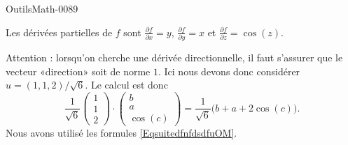 
\begin{corrige}{OutilsMath-0089}

    Les dérivées partielles de $f$ sont $\frac{ \partial f }{ \partial x }=y$, $\frac{ \partial f }{ \partial y }=x$ et $\frac{ \partial f }{ \partial z }=\cos(z)$.

    Attention : lorsqu'on cherche une dérivée directionnelle, il faut s'assurer que le vecteur «direction» soit de norme $1$. Ici nous devons donc considérer $u=(1,1,2)/\sqrt{6}$. Le calcul est donc
    \begin{equation}
        \frac{1}{ \sqrt{6} }\begin{pmatrix}
            1    \\ 
            1    \\ 
            2    
        \end{pmatrix}\cdot\begin{pmatrix}
            b    \\ 
            a    \\ 
            \cos(c)    
        \end{pmatrix}=\frac{1}{ \sqrt{6} }\big(b+a+2\cos(c)\big).
    \end{equation}
    Nous avons utilisé les formules \eqref{EqsuitedfnfdsdfuOM}.

\end{corrige}
